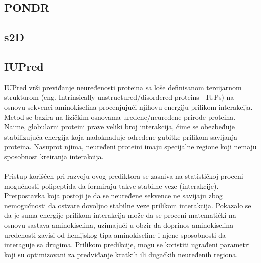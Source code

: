 \subsection{PONDR}





\subsection{s2D}



\subsection{IUPred}
IUPred vrši previđanje neuređenosti proteina sa loše definisanom tercijarnom strukturom (eng. Intrinsically unstructured/disordered proteins - IUPs) na osnovu sekvenci aminokiselina procenjujući njihovu energiju prilikom interakcija. Metod se bazira na fizičkim osnovama uređene/neuređene prirode proteina. Naime, globularni proteini prave veliki broj interakcija, čime se obezbeđuje stabilizujuća energija koja nadoknađuje određene gubitke prilikom savijanja proteina. Nasuprot njima, neuređeni proteini imaju specijalne regione koji nemaju sposobnost kreiranja interakcija.\\\\

Pristup korišćen pri razvoju ovog prediktora se zasniva na statističkoj proceni mogućnosti polipeptida da formiraju takve stabilne veze (interakcije). Pretpostavka koja postoji je da se neuređene sekvence ne savijaju zbog nemogućnosti da ostvare dovoljno stabilne veze prilikom interakcija. Pokazalo se da je suma energije prilikom interakcija može da se proceni matematički na osnovu sastava aminokiselina, uzimajući u obzir da doprinos aminokiselina uređenosti zavisi od hemijskog tipa aminokiseline i njene sposobnosti da interaguje sa drugima. Prilikom predikcije, mogu se koristiti ugrađeni parametri koji su optimizovani za predviđanje kratkih ili dugačkih neuređenih regiona. ~\cite{IUPred, IUPred1, IUPred2, IUPred3}


 
